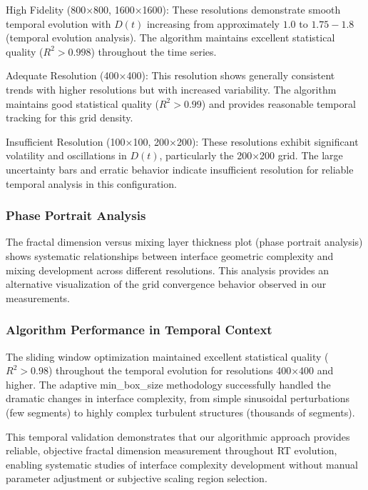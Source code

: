 \documentclass[preprint,12pt]{elsarticle}
\def\textbf#1{#1}%
\begin{document}
\textbf{High Fidelity (800×800, 1600×1600):} These resolutions demonstrate smooth temporal evolution with $D(t)$ increasing from approximately $1.0$ to $1.75-1.8$ (temporal evolution analysis). The algorithm maintains excellent statistical quality ($R^2 > 0.998$) throughout the time series.

\textbf{Adequate Resolution (400×400):} This resolution shows generally consistent trends with higher resolutions but with increased variability. The algorithm maintains good statistical quality ($R^2 > 0.99$) and provides reasonable temporal tracking for this grid density.

\textbf{Insufficient Resolution (100×100, 200×200):} These resolutions exhibit significant volatility and oscillations in $D(t)$, particularly the 200×200 grid. The large uncertainty bars and erratic behavior indicate insufficient resolution for reliable temporal analysis in this configuration.

\subsubsection{Phase Portrait Analysis}

The fractal dimension versus mixing layer thickness plot (phase portrait analysis) shows systematic relationships between interface geometric complexity and mixing development across different resolutions. This analysis provides an alternative visualization of the grid convergence behavior observed in our measurements.

\subsubsection{Algorithm Performance in Temporal Context}

The sliding window optimization maintained excellent statistical quality ($R^2 > 0.98$) throughout the temporal evolution for resolutions 400×400 and higher. The adaptive min\_box\_size methodology successfully handled the dramatic changes in interface complexity, from simple sinusoidal perturbations (few segments) to highly complex turbulent structures (thousands of segments).

This temporal validation demonstrates that our algorithmic approach provides reliable, objective fractal dimension measurement throughout RT evolution, enabling systematic studies of interface complexity development without manual parameter adjustment or subjective scaling region selection.
\end{document}
